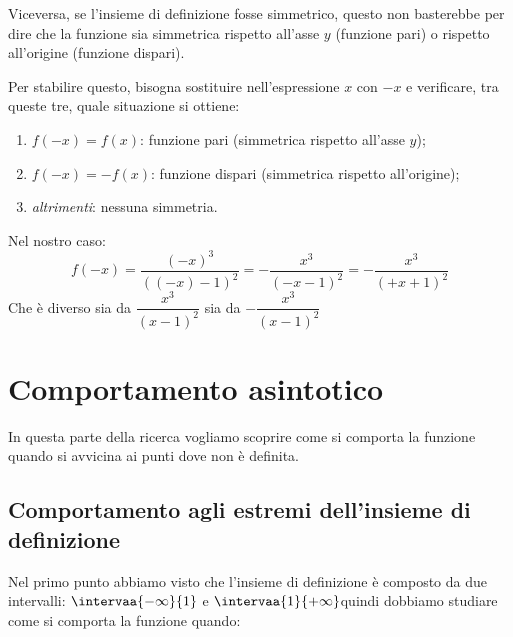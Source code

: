 Viceversa, se l'insieme di definizione fosse simmetrico, questo non 
basterebbe per dire che la funzione sia simmetrica rispetto all'asse \(y\) 
(funzione pari) o rispetto all'origine (funzione dispari).

Per stabilire questo, bisogna sostituire nell'espressione \(x\) con \(-x\) e 
verificare, tra queste tre, quale situazione si ottiene:

\begin{enumerate} [nosep]
\item \(f(-x)=f(x)\): funzione pari (simmetrica rispetto all'asse \(y\));
\item \(f(-x)=-f(x)\): funzione dispari (simmetrica rispetto all'origine);
\item \emph{altrimenti}: nessuna simmetria.
\end{enumerate}

Nel nostro caso: 
\[f(-x)=\dfrac{(-x)^3}{((-x)-1)^2} = -\dfrac{x^3}{(-x-1)^2} =
  -\dfrac{x^3}{(+x+1)^2}\]
Che è diverso sia da 
\(\dfrac{x^3}{(x-1)^2}\)
sia da
\(-\dfrac{x^3}{(x-1)^2}\)


\section{Comportamento asintotico}
\label{sec:comportamentoasintotico}

In questa parte della ricerca vogliamo scoprire come si comporta la funzione 
quando si avvicina ai punti dove non è definita.

\subsection{Comportamento agli estremi dell'insieme di definizione}

Nel primo punto abbiamo visto che l'insieme di definizione è composto da due 
intervalli: \(\intervaa{-\infty}{1}\) e \(\intervaa{1}{+\infty}\)quindi 
dobbiamo studiare come si comporta la funzione quando:


